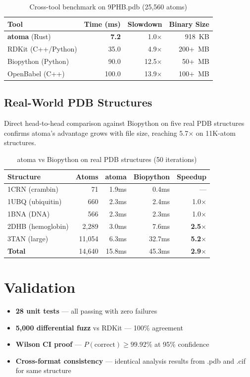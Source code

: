 \documentclass[10pt,conference]{IEEEtran}
\begin{document}
\begin{table}[h]
\centering
\caption{Cross-tool benchmark on 9PHB.pdb (25,560 atoms)}
\begin{tabular}{lrrr}
\toprule
\textbf{Tool} & \textbf{Time (ms)} & \textbf{Slowdown} & \textbf{Binary Size} \\
\midrule
\textbf{atoma} (Rust)    & \textbf{7.2}  & 1.0$\times$ & 918~KB \\
RDKit (C++/Python)       & 35.0  & 4.9$\times$ & 200+~MB \\
Biopython (Python)       & 90.0  & 12.5$\times$ & 50+~MB \\
OpenBabel (C++)          & 100.0 & 13.9$\times$ & 100+~MB \\
\bottomrule
\end{tabular}
\end{table}

\subsection{Real-World PDB Structures}
Direct head-to-head comparison against Biopython on five real PDB structures
confirms atoma's advantage grows with file size, reaching 5.7$\times$ on 11K-atom structures.

\begin{table}[h]
\centering
\caption{atoma vs Biopython on real PDB structures (50 iterations)}
\begin{tabular}{lrrrr}
\toprule
\textbf{Structure} & \textbf{Atoms} & \textbf{atoma} & \textbf{Biopython} & \textbf{Speedup} \\
\midrule
1CRN (crambin)     & 71    & 1.9ms & 0.4ms  & --- \\
1UBQ (ubiquitin)   & 660   & 2.3ms & 2.4ms  & 1.0$\times$ \\
1BNA (DNA)         & 566   & 2.3ms & 2.3ms  & 1.0$\times$ \\
2DHB (hemoglobin)  & 2,289 & 3.0ms & 7.6ms  & \textbf{2.5$\times$} \\
3TAN (large)       & 11,054& 6.3ms & 32.7ms & \textbf{5.2$\times$} \\
\midrule
\textbf{Total}     & 14,640& 15.8ms& 45.3ms & \textbf{2.9$\times$} \\
\bottomrule
\end{tabular}
\end{table}

\section{Validation}
\begin{itemize}
  \item \textbf{28 unit tests} --- all passing with zero failures
  \item \textbf{5,000 differential fuzz} vs RDKit --- 100\% agreement
  \item \textbf{Wilson CI proof} --- $P(\text{correct}) \geq 99.92\%$ at 95\% confidence
  \item \textbf{Cross-format consistency} --- identical analysis results from .pdb and .cif for same structure
\end{itemize}
\end{document}
